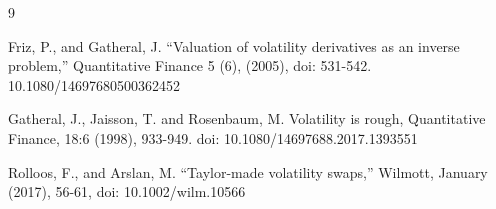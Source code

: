 \documentclass[11pt]{article}
\begin{document}
\begin{thebibliography}{9}





 Friz, P., and Gatheral, J. ``Valuation of volatility derivatives as an inverse problem,'' Quantitative Finance 5 (6), (2005), doi: 531-542. 10.1080/14697680500362452


 Gatheral, J., Jaisson, T. and Rosenbaum, M.  Volatility is rough, Quantitative Finance, 18:6 (1998), 933-949. doi: 10.1080/14697688.2017.1393551



 Rolloos, F., and Arslan, M. ``Taylor-made volatility swaps,'' Wilmott, January (2017), 56-61, doi: 10.1002/wilm.10566



\end{thebibliography}
\end{document}

